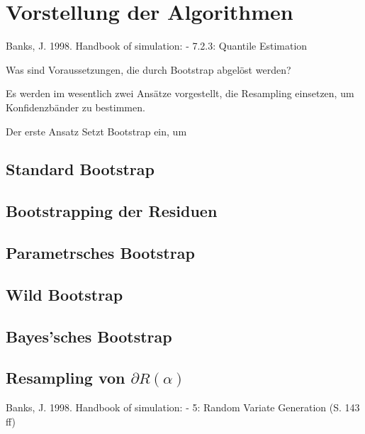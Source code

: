 \chapter{Vorstellung der Algorithmen}
\label{chapter:kap3}
Banks, J. 1998. Handbook of simulation: 
- 7.2.3: Quantile Estimation

Was sind Voraussetzungen, die durch Bootstrap abgelöst werden?



Es werden im wesentlich zwei Ansätze vorgestellt, die Resampling einsetzen, um Konfidenzbänder zu bestimmen.

Der erste Ansatz Setzt Bootstrap ein, um

\section{Standard Bootstrap}

\section{Bootstrapping der Residuen}

\section{Parametrsches Bootstrap}

\section{Wild Bootstrap}

\section{Bayes'sches Bootstrap}

\section{Resampling von $\partial R(\alpha)$}
Banks, J. 1998. Handbook of simulation: 
- 5: Random Variate Generation (S. 143 ff)